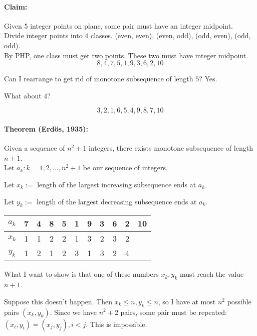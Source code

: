 \documentclass[a4paper, 11pt, twoside]{article}
\begin{document}
\paragraph{Claim:} Given $5$ integer points on plane, some pair must have an integer midpoint.\\

Divide integer points into $4$ classes. (even, even), (even, odd), (odd, even), (odd, odd).\\

By PHP, one class must get two points. These two must have integer midpoint.\\

\[8,4,7,5,1,9,3,6,2,10\]

Can I rearrange to get rid of monotone subsequence of length $5$? Yes.

What about $4$?

\[3,2,1,6,5,4,9,8,7,10\]

\paragraph{Theorem (Erdös, 1935):} Given a sequence of $n^2+1$ integers, there exists monotone subsequence of length $n+1$.\\

Let $a_k: k =1, 2, \dots, n^2+1$ be our sequence of integers.

Let $x_k:=$ length of the largest increasing subsequence ends at $a_k$.

Let $y_k:=$ length of the largest decreasing subsequence ends at $a_k$.

\begin{table}[htbp!] 
	\centering
	\begin{tabular}{|c|c|c|c|c|c|c|c|c|c|c|}
		\hline
		$a_k$ & 7 & 4 & 8 & 5 & 1 & 9 & 3 & 6 & 2 & 10 \\
		\hline
		$x_k$ & 1 & 1 & 2 & 2 & 1 & 3 & 2 & 3 & 2 & \\
		\hline
		$y_k$ & 1 & 2 & 1 & 2 & 3 & 1 & 3 & 2 & 4 & \\
		\hline
	\end{tabular}
\end{table}

What I want to show is that one of these numbers $x_k, y_k$ must reach the value $n+1$.

Suppose this doesn't happen. Then $x_k\leq n, y_k\leq n$, so I have at most $n^2$ possible pairs $(x_k, y_k)$. Since we have $n^2+2$ pairs, some pair must be repeated: $(x_i, y_i)=(x_j, y_j), i < j$. This is impossible.
\end{document}
